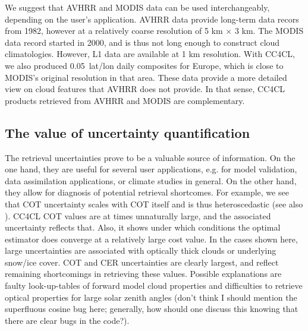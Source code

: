 We suggest that AVHRR and MODIS data can be used interchangeably, depending on the user's application. AVHRR data provide long-term data recors from 1982, however at a relatively coarse resolution of 5 km $\times$ 3 km. The MODIS data record started in 2000, and is thus not long enough to construct cloud climatologies. However, L1 data are available at 1 km resolution. With CC4CL, we also produced 0.05\textdegree\ lat/lon daily composites for Europe, which is close to MODIS's original resolution in that area. These data provide a more detailed view on cloud features that AVHRR does not provide. In that sense, CC4CL products retrieved from AVHRR and MODIS are complementary.

\subsection{The value of uncertainty quantification}


The retrieval uncertainties prove to be a valuable source of information. On the one hand, they are useful for several user applications, e.g. for model validation, data assimilation applications, or climate studies in general. On the other hand, they allow for diagnosis of potential retrieval shortcomes. For example, we see that COT uncertainty scales with COT itself and is thus heteroscedastic (see also \citet{Poulsen12}). CC4CL COT values are at times unnaturally large, and the associated uncertainty reflects that. Also, it shows under which conditions the optimal estimator does converge at a relatively large cost value. In the cases shown here, large uncertainties are associated with optically thick clouds or underlying snow/ice cover. COT and CER uncertainties are clearly largest, and reflect remaining shortcomings in retrieving these values. Possible explanations are faulty look-up-tables of forward model cloud properties and difficulties to retrieve optical properties for large solar zenith angles (don't think I should mention the superfluous cosine bug here; generally, how should one discuss this knowing that there are clear bugs in the code?). 

